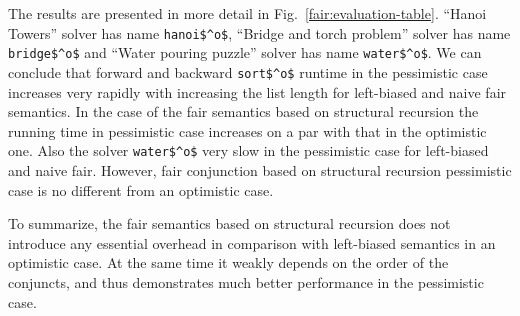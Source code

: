 The results are presented in more detail in Fig.~\ref{fair:evaluation-table}. ``Hanoi Towers'' solver has name \lstinline{hanoi$^o$}, ``Bridge and torch problem'' solver has name \lstinline{bridge$^o$} and ``Water pouring puzzle'' solver has name \lstinline{water$^o$}. We can conclude that forward and backward \lstinline{sort$^o$} runtime in the pessimistic case increases very rapidly with increasing the list length for left-biased and naive fair semantics. In the case of the fair semantics based on structural recursion the running time in pessimistic case increases on a par with that in the optimistic one. Also the solver \lstinline{water$^o$} very slow in the pessimistic case for left-biased and naive fair. However, fair conjunction based on structural recursion pessimistic case is no different from an optimistic case.


To summarize, the fair semantics based on structural recursion does not introduce any essential overhead in comparison with left-biased semantics in an optimistic case. At the same time it
weakly depends on the order of the conjuncts, and thus demonstrates much better performance in the pessimistic case.
